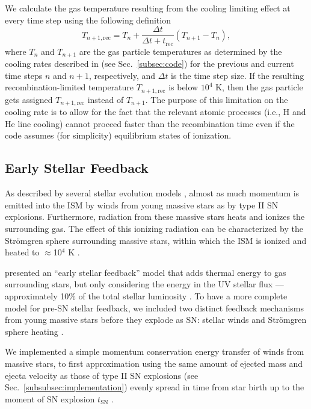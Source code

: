\documentclass[iop]{emulateapj}
\begin{document}
We calculate the gas temperature resulting from the cooling limiting effect at every time step using the following definition
\begin{equation}\label{Trec}
  T_{n+1,\mathrm{rec}} = T_n + \frac{\Delta t}{\Delta t + t_{\mathrm{rec}}}(T_{n+1} - T_n),
\end{equation}
where $T_n$ and $T_{n+1}$ are the gas particle temperatures as determined by the cooling rates described in \citet{Aumer13} (see Sec.~\ref{subsec:code}) for the previous and current time steps $n$ and $n+1$, respectively, and $\Delta t$ is the time step size. If the resulting recombination-limited temperature $T_{n+1,\mathrm{rec}}$ is below $10^4$ K, then the gas particle gets assigned $T_{n+1,\mathrm{rec}}$ instead of $T_{n+1}$. The purpose of this limitation on the cooling rate is to allow for the fact that the relevant atomic processes (i.e., H and He line cooling) cannot proceed faster than the recombination time even if the code assumes (for simplicity) equilibrium states of ionization.

\subsection{Early Stellar Feedback}\label{subsec:youngfb}
As described by several stellar evolution models \citep[e.g.,][]{Leitherer99}, almost as much momentum is emitted into the ISM by winds from young massive stars as by type II SN explosions. Furthermore, radiation from these massive stars heats and ionizes the surrounding gas. The effect of this ionizing radiation can be characterized by the Str\"omgren sphere \citep{Stromgren39} surrounding massive stars, within which the ISM is ionized and heated to $\approx$10$^4$ K \citep{Hopkins12, Renaud13}.

\citet{Stinson13} presented an ``early stellar feedback'' model that adds thermal energy to gas surrounding stars, but only considering the energy in the UV stellar flux ---approximately 10\% of the total stellar luminosity \citep{Leitherer99}. To have a more complete model for pre-SN stellar feedback, we included two distinct feedback mechanisms from young massive stars before they explode as SN: stellar winds and Str\"omgren sphere heating \citep[see e.g.,][]{Agertz13, Renaud13}.

We implemented a simple momentum conservation energy transfer of winds from massive stars, to first approximation using the same amount of ejected mass and ejecta velocity as those of type II SN explosions (see Sec.~\ref{subsubsec:implementation}) evenly spread in time from star birth up to the moment of SN explosion $t_{\mathrm{SN}}$ \citep[for a detailed description of stellar winds see][]{Kudritzki00}.
\end{document}

